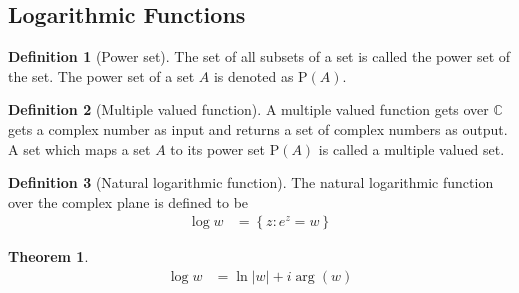 \documentclass[titlepage, fleqn, a4paper, 12pt, twoside]{article}
\theoremstyle{definition}
\newtheorem{definition}{Definition}
\theoremstyle{theorem}
\newtheorem{theorem}{Theorem}
\begin{document}
\subsection{Logarithmic Functions}

\begin{definition}[Power set]
	The set of all subsets of a set is called the power set of the set.
	The power set of a set $A$ is denoted as $\mathrm{P}(A)$.
\end{definition}

\begin{definition}[Multiple valued function]
	\marginnote
	{
		A multiple valued function gets over $\mathbb{C}$ gets a complex number as input and returns a set of complex numbers as output.
	}
	A set which maps a set $A$ to its power set $\mathrm{P}(A)$ is called a multiple valued set.
\end{definition}

\begin{definition}[Natural logarithmic function]
	The natural logarithmic function over the complex plane is defined to be
	\begin{align*}
		\log w &= \left\{ z : e^z = w \right\}
	\end{align*}
\end{definition}

\begin{theorem}
	\begin{align*}
		\log w &= \ln |w| + i \arg(w)
	\end{align*}
\end{theorem}
\end{document}
